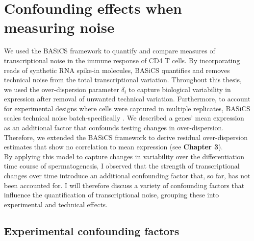 \newpage

\section{Confounding effects when measuring noise}

We used the BASiCS framework to quantify and compare measures of transcriptional noise in the immune response of CD4\plus{} T cells. By incorporating reads of synthetic RNA spike-in molecules, BASiCS quantifies and removes technical noise from the total transcriptional variation. Throughout this thesis, we used the over-dispersion parameter $\delta_i$ to capture biological variability in expression after removal of unwanted technical variation. Furthermore, to account for experimental designs where cells were captured in multiple replicates, BASiCS scales technical noise batch-specifically  \citep{Vallejos2015BASiCS}. We described a genes' mean expression as an additional factor that confounds testing changes in over-dispersion. Therefore, we extended the BASiCS framework to derive residual over-dispersion estimates that show no correlation to mean expression (see \textbf{Chapter 3}). \\

By applying this model to capture changes in variability over the differentiation time course of spermatogenesis, I observed that the strength of transcriptional changes over time introduce an additional confounding factor that, so far, has not been accounted for. I will therefore discuss a variety of confounding factors that influence the quantification of transcriptional noise, grouping these into experimental and technical effects.

\subsection{Experimental confounding factors}

